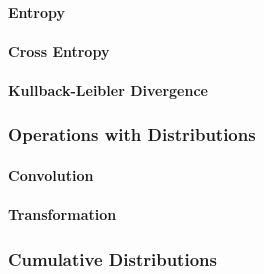 \paragraph{Entropy}

\paragraph{Cross Entropy}


\paragraph{Kullback-Leibler Divergence}



\subsubsection{Operations with Distributions}

\paragraph{Convolution}


\paragraph{Transformation}





\subsubsection{Cumulative Distributions}



